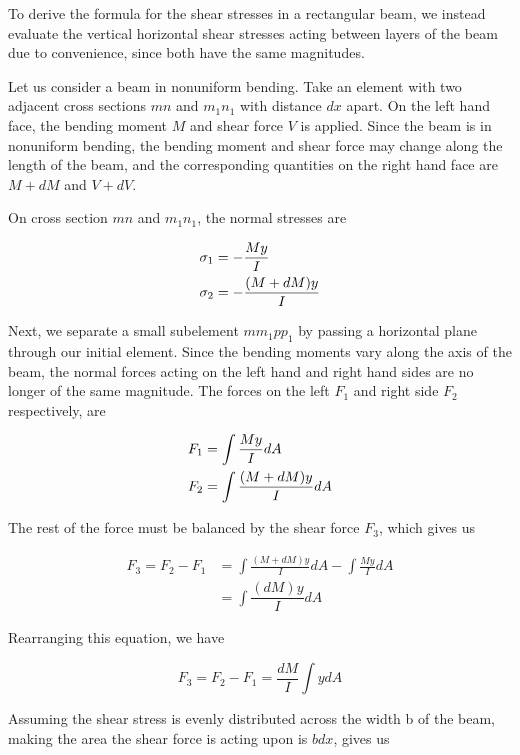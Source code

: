 \documentclass[
10pt,
a4paper,
openany,
svgnames,
]{book} %
\begin{document}
To derive the formula for the shear stresses in a rectangular beam, we instead evaluate the vertical horizontal shear stresses acting between layers of the beam due to convenience, since both have the same magnitudes.

Let us consider a beam in nonuniform bending. Take an element with two adjacent cross sections $mn$ and $m_1n_1$ with distance $dx$ apart. On the left hand face, the bending moment $M$ and shear force $V$ is applied. Since the beam is in nonuniform bending, the bending moment and shear force may change along the length of the beam, and the corresponding quantities on the right hand face are $M + dM$ and $V + dV$.

On cross section $mn$ and $m_1n_1$, the normal stresses are

\[\begin{gathered}
  \sigma _1 =  - \frac{My}{I} \hfill \\
  \sigma _2 =  - \frac{(M + dM)y}{I} \hfill \\ 
\end{gathered} \]

Next, we separate a small subelement $mm_1pp_1$ by passing a horizontal plane through our initial element. Since the bending moments vary along the axis of the beam, the normal forces acting on the left hand and right hand sides are no longer of the same magnitude. The forces on the left $F_1$ and right side $F_2$ respectively, are

\[\begin{gathered}
    F_1 = \int \frac{My}{I}dA \hfill \\
    F_2 = \int \frac{(M + dM)y}{I}dA \hfill \\ 
  \end{gathered} \]

The rest of the force must be balanced by the shear force $F_3$, which gives us

\begin{align*}
  F_3 = F_2 - F_1 &= \int \frac{(M + dM)y}{I}dA  - \int \frac{My}{I}dA  \\ 
                        &= \int \dfrac{(dM)y}{I}dA 
 \end{align*}

 Rearranging this equation, we have

\begin{equation} \label{eqn: shear stress eval}
  F_3 = F_2 - F_1 = \frac{dM}{I}\int y dA
\end{equation}

Assuming the shear stress is evenly distributed across the width b of the beam, making the area the shear force is acting upon is $bdx$, gives us
\end{document}
